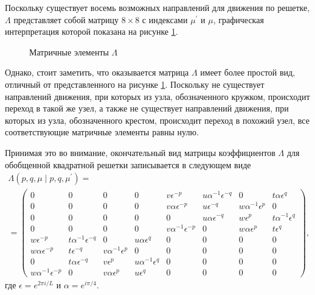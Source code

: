 Поскольку существует восемь возможных направлений для движения по решетке, $\Lambda$ представляет собой матрицу $8 \times 8$ с индексами $\mu^{'}$ и $\mu$, графическая интерпретация которой показана на рисунке \ref{matrixGen}. 

 \begin{figure}[h]
 	\caption{Матричные элементы $\Lambda$}
 	\label{matrixGen}
 \end{figure}

Однако, стоит заметить, что оказывается матрица $\Lambda$ имеет более простой вид, отличный от представленного на рисунке  \ref{matrixGen}. Поскольку не существует направлений движения, при которых из узла, обозначенного кружком, происходит переход в такой же узел, а также не существует направлений движения, при которых из узла, обозначенного крестом, происходит переход в похожий узел, все соответствующие матричные элементы равны нулю.

Принимая это во внимание, окончательный вид матрицы коэффициентов $\Lambda$ для обобщенной квадратной решетки записывается в следующем виде
\begin{multline}
\Lambda (p, q, \mu\; |\; p, q, \mu^{'}) = \\ =
\begin{pmatrix}
0 \!\!\!& 0 \!\!\!& 0 \!\!\!& 0\!\!\! & v \epsilon^{-p} \!\!\!& u \alpha^{-1} \epsilon^{-q} \!\!\!& 0 \!\!\!& t \alpha \epsilon^{q} \!\!\! \\
0 \!\!\!& 0 \!\!\!& 0 \!\!\!& 0 \!\!\!& v \alpha \epsilon^{-p}\!\!\! & u \epsilon^{-q}\!\!\! & w \alpha^{-1} \epsilon^{p}\!\!\! & 0\!\!\! \\
0 \!\!\!& 0 \!\!\!& 0 \!\!\!& 0\!\!\! & 0\!\!\! & u \alpha \epsilon^{-q} \!\!\!& w \epsilon^{p} \!\!\!& t \alpha^{-1} \epsilon^{q}\!\!\!  \\
0 \!\!\!& 0 \!\!\!& 0 \!\!\!& 0\!\!\! & v \alpha^{-1} \epsilon^{-p}\!\!\! & 0 \!\!\!& w \alpha \epsilon^{p} \!\!\!& t \epsilon^{q}\!\!\!  \\
w \epsilon^{-p} \!\!\!& t \alpha^{-1} \epsilon^{-q} \!\!\!& 0\!\!\! & u \alpha \epsilon^{q}\!\!\! & 0\!\!\! & 0\!\!\! & 0\!\!\! & 0\!\!\!  \\
w \alpha \epsilon^{-p}\!\!\! & t \epsilon^{-q} \!\!\!& v \alpha^{-1} \epsilon^{p}\!\!\! & 0 \!\!\!& 0\!\!\! & 0\!\!\! & 0\!\!\! & 0\!\!\! \\
0 \!\!\!& t \alpha \epsilon^{-q}\!\!\! & v \epsilon^{p} \!\!\!& u \alpha^{-1} \epsilon^{q}\!\!\! & 0 \!\!\!& 0\!\!\! & 0\!\!\! & 0 \!\!\! \\
w \alpha^{-1} \epsilon^{-p}\!\!\! & 0\!\!\! & v \alpha \epsilon^{p}\!\!\! & u \epsilon^{q} \!\!\!& 0\!\!\! & 0\!\!\! & 0 \!\!\!& 0 \!\!\!
\end{pmatrix},
\end{multline}
где $\epsilon = e^{2\pi i/L}$ и $\alpha = e^{i\pi/4}$.

